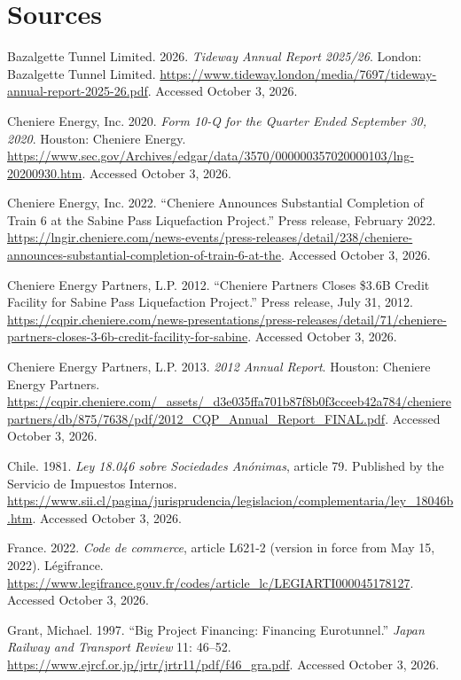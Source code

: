 \section*{Sources}
\begin{sources}
\item Bazalgette Tunnel Limited. 2026. \textit{Tideway Annual Report 2025/26}. London: Bazalgette Tunnel Limited. \url{https://www.tideway.london/media/7697/tideway-annual-report-2025-26.pdf}. Accessed October 3, 2026.
\item Cheniere Energy, Inc. 2020. \textit{Form 10-Q for the Quarter Ended September 30, 2020}. Houston: Cheniere Energy. \url{https://www.sec.gov/Archives/edgar/data/3570/000000357020000103/lng-20200930.htm}. Accessed October 3, 2026.
\item Cheniere Energy, Inc. 2022. ``Cheniere Announces Substantial Completion of Train 6 at the Sabine Pass Liquefaction Project.'' Press release, February 2022. \url{https://lngir.cheniere.com/news-events/press-releases/detail/238/cheniere-announces-substantial-completion-of-train-6-at-the}. Accessed October 3, 2026.
\item Cheniere Energy Partners, L.P. 2012. ``Cheniere Partners Closes \$3.6B Credit Facility for Sabine Pass Liquefaction Project.'' Press release, July 31, 2012. \url{https://cqpir.cheniere.com/news-presentations/press-releases/detail/71/cheniere-partners-closes-3-6b-credit-facility-for-sabine}. Accessed October 3, 2026.
\item Cheniere Energy Partners, L.P. 2013. \textit{2012 Annual Report}. Houston: Cheniere Energy Partners. \url{https://cqpir.cheniere.com/_assets/_d3e035ffa701b87f8b0f3cceeb42a784/chenierepartners/db/875/7638/pdf/2012_CQP_Annual_Report_FINAL.pdf}. Accessed October 3, 2026.
\item Chile. 1981. \textit{Ley 18.046 sobre Sociedades Anónimas}, article 79. Published by the Servicio de Impuestos Internos. \url{https://www.sii.cl/pagina/jurisprudencia/legislacion/complementaria/ley_18046b.htm}. Accessed October 3, 2026.
\item France. 2022. \textit{Code de commerce}, article L621-2 (version in force from May 15, 2022). Légifrance. \url{https://www.legifrance.gouv.fr/codes/article_lc/LEGIARTI000045178127}. Accessed October 3, 2026.
\item Grant, Michael. 1997. ``Big Project Financing: Financing Eurotunnel.'' \textit{Japan Railway and Transport Review} 11: 46--52. \url{https://www.ejrcf.or.jp/jrtr/jrtr11/pdf/f46_gra.pdf}. Accessed October 3, 2026.

\end{sources}
